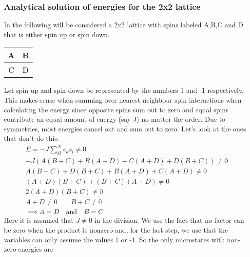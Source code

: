 \documentclass[a4paper, 12pt]{article}
\begin{document}
\subsubsection{Analytical solution of energies for the 2x2 lattice}
	In the following will be considered a 2x2 lattice with spins labeled A,B,C and D that is either spin up or spin down.
	\begin{center}
	\begin{tabular}{ | c | c | }
	\hline
	A & B \\ \hline
	C & D \\
	\hline
	\end{tabular}
	\end{center}
	Let spin up and spin down be represented by the numbers 1 and -1 respectively. This makes sense when summing over nearest neighbour spin interactions when calculating the energy since opposite spins sum out to zero and equal spins contribute an equal amount of energy (say J) no matter the order.
	Due to symmetries, most energies cancel out and sum out to zero. Let's look at the ones that don't do this:
	\begin{align*}
		E = -J\sum_{kl}^Ns_k s_l \neq 0\\
		-J(A(B+C)+B(A+D)+C(A+D)+D(B+C)) \neq 0\\
		A(B+C)+D(B+C)+B(A+D)+C(A+D) \neq 0 \\
		(A+D)(B+C)+(B+C)(A+D) \neq 0 \\
		2(A+D)(B+C) \neq 0 \\
		A+D \neq 0 \qquad B+C \neq 0 \\
		\implies A=D \quad \mathrm{and} \quad B=C
	\end{align*}
	Here it is assumed that $J\neq 0$ in the division. We use the fact that no factor can be zero when the product is nonzero and, for the last step, we use that the variables can only assume the values 1 or -1.
	So the only microstates with non-zero energies are
\end{document}
